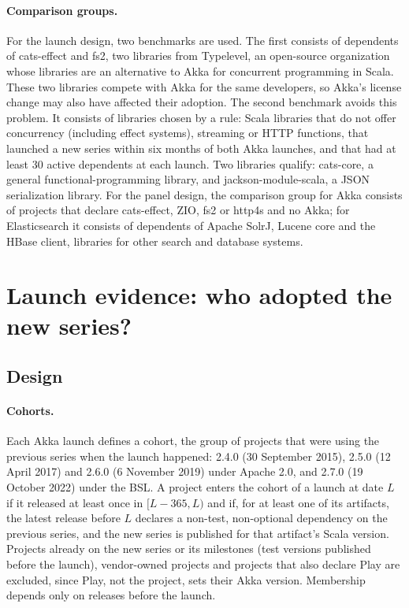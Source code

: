 \documentclass[11pt]{article}
\begin{document}
\paragraph{Comparison groups.} For the launch design, two benchmarks are used. The first consists of dependents of cats-effect and fs2, two libraries from Typelevel, an open-source organization whose libraries are an alternative to Akka for concurrent programming in Scala. These two libraries compete with Akka for the same developers, so Akka's license change may also have affected their adoption. The second benchmark avoids this problem. It consists of libraries chosen by a rule: Scala libraries that do not offer concurrency (including effect systems), streaming or HTTP functions, that launched a new series within six months of both Akka launches, and that had at least 30 active dependents at each launch. Two libraries qualify: cats-core, a general functional-programming library, and jackson-module-scala, a JSON serialization library. For the panel design, the comparison group for Akka consists of projects that declare cats-effect, ZIO, fs2 or http4s and no Akka; for Elasticsearch it consists of dependents of Apache SolrJ, Lucene core and the HBase client, libraries for other search and database systems.

\section{Launch evidence: who adopted the new series?}\label{sec:launch}

\subsection{Design}

\paragraph{Cohorts.} Each Akka launch defines a cohort, the group of projects that were using the previous series when the launch happened: 2.4.0 (30 September 2015), 2.5.0 (12 April 2017) and 2.6.0 (6 November 2019) under Apache 2.0, and 2.7.0 (19 October 2022) under the BSL. A project enters the cohort of a launch at date $L$ if it released at least once in $[L-365, L)$ and if, for at least one of its artifacts, the latest release before $L$ declares a non-test, non-optional dependency on the previous series, and the new series is published for that artifact's Scala version. Projects already on the new series or its milestones (test versions published before the launch), vendor-owned projects and projects that also declare Play are excluded, since Play, not the project, sets their Akka version. Membership depends only on releases before the launch.
\end{document}
